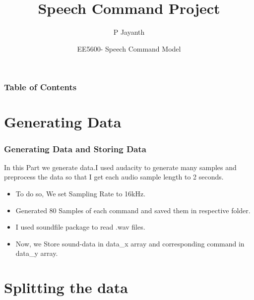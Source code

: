 \documentclass{beamer}
\title[Speech Command Project] %
{Speech Command Project}
\author[P Jayanth] %
{P Jayanth}
\institute[ma18btech11004] %
{MA18BTECH11004}
\date[EE5600] %
{EE5600- Speech Command Model}
\begin{document}
\frame{\titlepage}



\begin{frame}
\frametitle{Table of Contents}
\tableofcontents
\end{frame}


\section{Generating Data}


\begin{frame}
\frametitle{Generating Data and Storing Data}

In this Part we generate data.I used audacity to generate many samples and preprocess the data so that I get each audio sample length to 2 seconds.\\

\begin{itemize}
    \item<1-> To do so, We set Sampling Rate to 16kHz. 
    \item<2-> Generated  80 Samples of each command and saved them in respective folder.
    \item<3-> I used soundfile package to read .wav files. 
    \item<4-> Now, we Store sound-data in data\_x array and corresponding  command in data\_y array.
\end{itemize}
\end{frame}




\section{Splitting the data}
\end{document}
